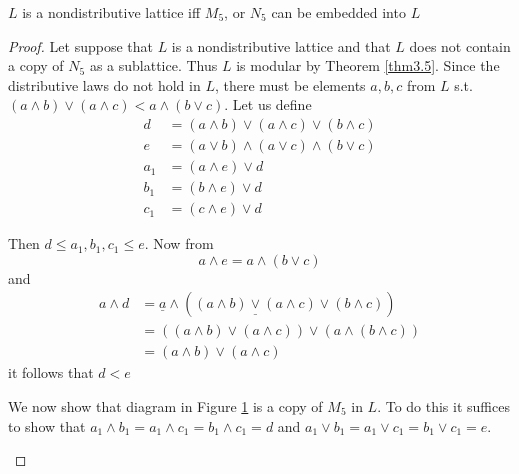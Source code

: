 \documentclass[11pt]{article}
\begin{document}
\begin{theorem}[Birkhoff]
\(L\) is a nondistributive lattice iff \(M_5\), or \(N_5\) can be embedded into \(L\)
\end{theorem}

\begin{proof}
Let suppose that \(L\) is a nondistributive lattice and that \(L\) does not contain
a copy of \(N_5\) as a sublattice. Thus \(L\) is modular by Theorem \ref{thm3.5}.
Since the distributive laws do not hold in \(L\), there must be elements
\(a,b,c\) from \(L\) s.t. \((a\wedge b)\vee(a\wedge c)<a\wedge(b\vee c)\). Let
us define
\begin{align*}
d&=(a\wedge b)\vee(a\wedge c)\vee(b\wedge c)\\
e&=(a\vee b)\wedge(a\vee c)\wedge(b\vee c)\\
a_1&=(a\wedge e)\vee d\\
b_1&=(b\wedge e)\vee d\\
c_1&=(c\wedge e)\vee d
\end{align*}

Then \(d\le a_1,b_1,c_1\le e\). Now from
\begin{equation*}
a\wedge e=a\wedge(b\vee c)
\end{equation*}
and
\begin{align*}
a\wedge d&=\underline{a}\wedge(\underline{(a\wedge b)\vee(a\wedge c)}\vee(b\wedge c))\\
&=((a\wedge b)\vee(a\wedge c))\vee(a\wedge(b\wedge c))\tag*{by M}\\
&=(a\wedge b)\vee(a\wedge c)
\end{align*}
it follows that \(d<e\)

We now show that diagram in Figure \ref{fig:3.6} is a copy of \(M_5\) in \(L\). To
do this it suffices to show that 
\(a_1\wedge b_1=a_1\wedge c_1=b_1\wedge c_1=d\) 
and \(a_1\vee b_1=a_1\vee c_1=b_1\vee c_1=e\).


\begin{figure}
\centering
{}
\caption{}
\label{fig:3.6}
\end{figure}


\end{proof}
\end{document}
